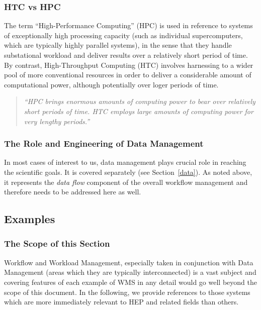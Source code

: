
\subsubsection{HTC vs HPC}
The term ``High-Performance Computing'' (HPC) is used in reference to systems of exceptionally high processing capacity (such as individual supercomputers, which are typically highly parallel systems),
in the sense that they handle substational workload and deliver results over a relatively short period of time. By contrast, High-Throughput Computing (HTC) involves harnessing to a wider pool
of more conventional resources in order to deliver a considerable amount of computational power, although potentially over loger periods of time. 
\begin{quote}
\textit{``HPC brings enormous amounts of computing power to bear over relatively short periods of time. HTC employs large amounts of computing power for very lengthy periods.''}~\cite{htc}
\end{quote}

\subsubsection{The Role and Engineering of Data Management}
In most cases of interest to us, data management plays crucial role in reaching the scientific goals. It is covered separately (see Section~\ref{data}).
As noted above, it represents the \textit{data flow} component of the overall workflow management and therefore needs to be addressed here as well.




\subsection{Examples}
\label{wms_examples}
\subsubsection{The Scope of this Section}
Workflow and Workload Management, especially taken in conjunction with Data Management (areas which they are typically interconnected) is a vast
subject and  covering features of each example of WMS in any detail would go well beyond the scope of this document. In the following, we provide references
to those systems which are more immediately relevant to HEP and related fields than others.

